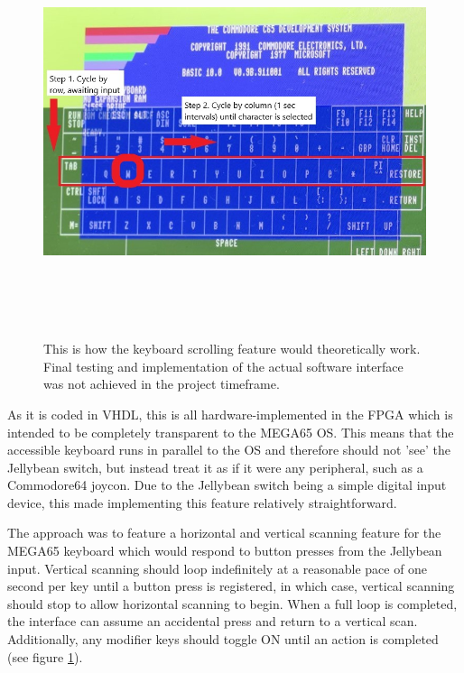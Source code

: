 \begin{figure} [h]
    \centering
    \includegraphics[width=12cm,height=12cm,keepaspectratio]{Figures/keyboard.jpg}
    \caption{This is how the keyboard scrolling feature would theoretically work. Final testing and implementation of the actual software interface was not achieved in the project timeframe.}
    \label{fig:Keyboard}
\end{figure}

As it is coded in VHDL, this is all hardware-implemented in the FPGA which is intended to be completely transparent to the MEGA65 OS.
This means that the accessible keyboard runs in parallel to the OS and therefore should not 'see' the Jellybean switch, but instead treat it as if it were any peripheral, such as a Commodore64 joycon.
Due to the Jellybean switch being a simple digital input device, this made implementing this feature relatively straightforward.

The approach was to feature a horizontal and vertical scanning feature for the MEGA65 keyboard which would respond to button presses from the Jellybean input.
Vertical scanning should loop indefinitely at a reasonable pace of one second per key until a button press is registered, in which case, vertical scanning should stop to allow horizontal scanning to begin.
When a full loop is completed, the interface can assume an accidental press and return to a vertical scan. %
Additionally, any modifier keys should toggle ON until an action is completed (see figure \ref{fig:Keyboard}).

